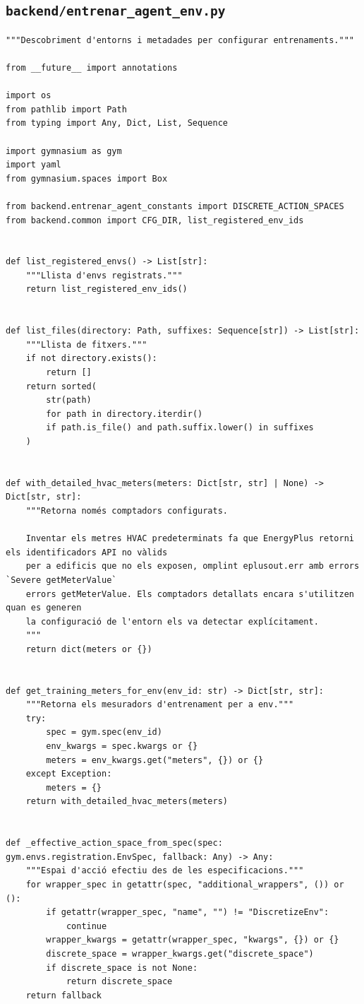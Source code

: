 \documentclass[10pt,a4paper]{article}
\begin{document}

\subsection{\texorpdfstring{\texttt{backend/entrenar\_agent\_env.py}}{backend/entrenar\_agent\_env.py}}

\begin{lstlisting}[style=studioPython,caption={backend/entrenar\_agent\_env.py},label={lst:backend-entrenar-agent-env-py}]
"""Descobriment d'entorns i metadades per configurar entrenaments."""

from __future__ import annotations

import os
from pathlib import Path
from typing import Any, Dict, List, Sequence

import gymnasium as gym
import yaml
from gymnasium.spaces import Box

from backend.entrenar_agent_constants import DISCRETE_ACTION_SPACES
from backend.common import CFG_DIR, list_registered_env_ids


def list_registered_envs() -> List[str]:
    """Llista d'envs registrats."""
    return list_registered_env_ids()


def list_files(directory: Path, suffixes: Sequence[str]) -> List[str]:
    """Llista de fitxers."""
    if not directory.exists():
        return []
    return sorted(
        str(path)
        for path in directory.iterdir()
        if path.is_file() and path.suffix.lower() in suffixes
    )


def with_detailed_hvac_meters(meters: Dict[str, str] | None) -> Dict[str, str]:
    """Retorna només comptadors configurats.

    Inventar els metres HVAC predeterminats fa que EnergyPlus retorni els identificadors API no vàlids
    per a edificis que no els exposen, omplint eplusout.err amb errors `Severe getMeterValue`
    errors getMeterValue. Els comptadors detallats encara s'utilitzen quan es generen
    la configuració de l'entorn els va detectar explícitament.
    """
    return dict(meters or {})


def get_training_meters_for_env(env_id: str) -> Dict[str, str]:
    """Retorna els mesuradors d'entrenament per a env."""
    try:
        spec = gym.spec(env_id)
        env_kwargs = spec.kwargs or {}
        meters = env_kwargs.get("meters", {}) or {}
    except Exception:
        meters = {}
    return with_detailed_hvac_meters(meters)


def _effective_action_space_from_spec(spec: gym.envs.registration.EnvSpec, fallback: Any) -> Any:
    """Espai d'acció efectiu des de les especificacions."""
    for wrapper_spec in getattr(spec, "additional_wrappers", ()) or ():
        if getattr(wrapper_spec, "name", "") != "DiscretizeEnv":
            continue
        wrapper_kwargs = getattr(wrapper_spec, "kwargs", {}) or {}
        discrete_space = wrapper_kwargs.get("discrete_space")
        if discrete_space is not None:
            return discrete_space
    return fallback



\end{lstlisting}
\end{document}
